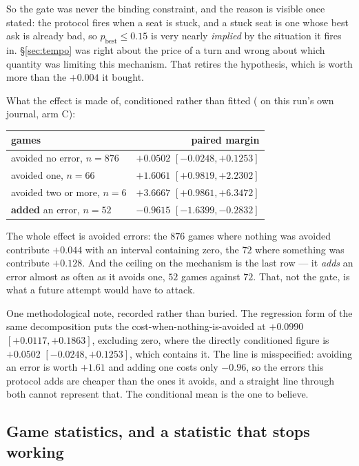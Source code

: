 \documentclass[11pt,a4paper]{article}
\begin{document}
So the gate was never the binding constraint, and the reason is visible once
stated: the protocol fires when a seat is stuck, and a stuck seat is one whose
best ask is already bad, so $p_{\text{best}} \leq 0.15$ is very nearly
\emph{implied} by the situation it fires in. \S\ref{sec:tempo} was right about
the price of a turn and wrong about which quantity was limiting this mechanism.
That retires the hypothesis, which is worth more than the $+0.004$ it bought.

What the effect is made of, conditioned rather than fitted
( on this run's own journal, arm C):

\begin{center}
\small
\begin{tabular}{lr}
\toprule
games & paired margin \\
\midrule
avoided no error, $n = 876$ & $+0.0502$ $[-0.0248, +0.1253]$ \\
avoided one, $n = 66$ & $+1.6061$ $[+0.9819, +2.2302]$ \\
avoided two or more, $n = 6$ & $+3.6667$ $[+0.9861, +6.3472]$ \\
\textbf{added} an error, $n = 52$ & $-0.9615$ $[-1.6399, -0.2832]$ \\
\bottomrule
\end{tabular}
\end{center}

The whole effect is avoided errors: the $876$ games where nothing was avoided
contribute $+0.044$ with an interval containing zero, the $72$ where something
was contribute $+0.128$. And the ceiling on the mechanism is the last row ---
it \emph{adds} an error almost as often as it avoids one, $52$ games against
$72$. That, not the gate, is what a future attempt would have to attack.

One methodological note, recorded rather than buried. The regression form of
the same decomposition puts the cost-when-nothing-is-avoided at $+0.0990$
$[+0.0117, +0.1863]$, excluding zero, where the directly conditioned figure is
$+0.0502$ $[-0.0248, +0.1253]$, which contains it. The line is misspecified:
avoiding an error is worth $+1.61$ and adding one costs only $-0.96$, so the
errors this protocol adds are cheaper than the ones it avoids, and a straight
line through both cannot represent that. The conditional mean is the one to
believe.

\subsection{Game statistics, and a statistic that stops working}
\label{sec:res-analytics}
\end{document}
